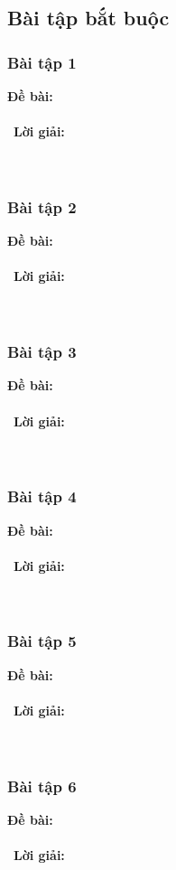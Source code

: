 \documentclass[a4paper]{article}
\begin{document}
\subsection{Bài tập bắt buộc}
\subsubsection{Bài tập 1}
\textbf{Đề bài:} 
\\\ \\\
\textbf{Lời giải:} \\\ \\\
\clearpage
\subsubsection{Bài tập 2}
\textbf{Đề bài:} 
\\\ \\\
\textbf{Lời giải:} \\\ \\\
\clearpage
\subsubsection{Bài tập 3}
\textbf{Đề bài:} 
\\\ \\\
\textbf{Lời giải:} \\\ \\\
\clearpage
\subsubsection{Bài tập 4}
\textbf{Đề bài:} 
\\\ \\\
\textbf{Lời giải:} \\\ \\\
\clearpage
\subsubsection{Bài tập 5}
\textbf{Đề bài:} 
\\\ \\\
\textbf{Lời giải:} \\\ \\\
\clearpage
\subsubsection{Bài tập 6}
\textbf{Đề bài:} 
\\\ \\\
\textbf{Lời giải:} \\\ \\\
\clearpage
\end{document}
